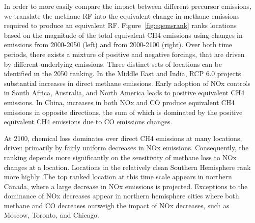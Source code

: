 In order to more easily compare the impact between different precursor emissions, we translate the methane RF into the equivalent change in methane emissions required to produce an equivalent RF. Figure~\ref{fig:eqemsrank} ranks locations based on the magnitude of the total equivalent CH4 emissions using changes in emissions from 2000-2050 (left) and from 2000-2100 (right). Over both time periods, there exists a mixture of positive and negative forcings, that are driven by different underlying emissions. Three distinct sets of locations can be identified in the 2050 ranking. In the Middle East and India, RCP 6.0 projects substantial increases in direct methane emissions. Early adoption of NOx controls in South Africa, Australia, and North America leads to positive equivalent CH4 emissions. In China, increases in both NOx and CO produce equivalent CH4 emissions in opposite directions, the sum of which is dominated by the positive equivalent CH4 emissions due to CO emissions changes.

At 2100, chemical loss dominates over direct CH4 emissions at many locations, driven primarily by fairly uniform decreases in NOx emissions. Consequently, the ranking depends more significantly on the sensitivity of methane loss to NOx changes at a location. Locations in the relatively clean Southern Hemisphere rank more highly. The top ranked location at this time scale appears in northern Canada, where a large decrease in NOx emissions is projected. Exceptions to the dominance of NOx decreases appear in northern hemisphere cities where both methane and CO decreases outweigh the impact of NOx decreases, such as Moscow, Toronto, and Chicago. 

